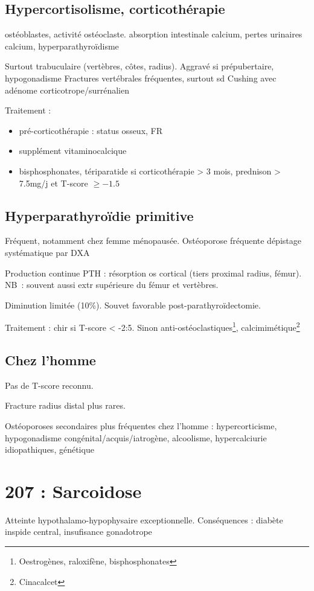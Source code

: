 \documentclass[11pt]{article}
\begin{document}
\subsection{Hypercortisolisme, corticothérapie}
\label{sec:org26aeaa4}

\dec ostéoblastes, \inc activité ostéoclaste. \dec absorption intestinale
calcium, \inc pertes urinaires calcium, hyperparathyroïdisme

Surtout trabuculaire (vertèbres, côtes, radius). Aggravé si prépubertaire, hypogonadisme
Fractures vertébrales fréquentes, surtout sd Cushing avec adénome
corticotrope/surrénalien

Traitement : 
\begin{itemize}
\item pré-corticothérapie : status osseux, FR
\item supplément vitaminocalcique
\item bisphosphonates, tériparatide si corticothérapie > 3 mois, prednison > 7.5mg/j
et T-score \(\ge -1.5\)
\end{itemize}

\subsection{Hyperparathyroïdie primitive}
\label{sec:orgefdc920}
Fréquent, notamment chez femme ménopausée. Ostéoporose fréquente \thus dépistage
systématique par DXA

Production continue PTH : \inc résorption os cortical (tiers proximal radius,
fémur). NB : souvent aussi extr supérieure du fémur et vertèbres. 

Diminution limitée (10\%). Souvet favorable post-parathyroïdectomie.

Traitement : chir si T-score < -2:5. Sinon anti-ostéoclastiques\footnote{Oestrogènes, raloxifène, bisphosphonates}, calcimimétique\footnote{Cinacalcet}

\subsection{Chez l'homme}
\label{sec:org3f16cc9}
Pas de T-score reconnu. 

Fracture radius distal plus rares.

Ostéoporoses secondaires plus fréquentes chez l'homme : hypercorticisme,
hypogonadisme congénital/acquis/iatrogène, alcoolisme, hypercalciurie
idiopathiques, génétique
\section{207 : Sarcoidose}
\label{sec:org7f49194}
Atteinte hypothalamo-hypophysaire exceptionnelle. Conséquences : diabète
inspide central, insufisance gonadotrope
\end{document}
